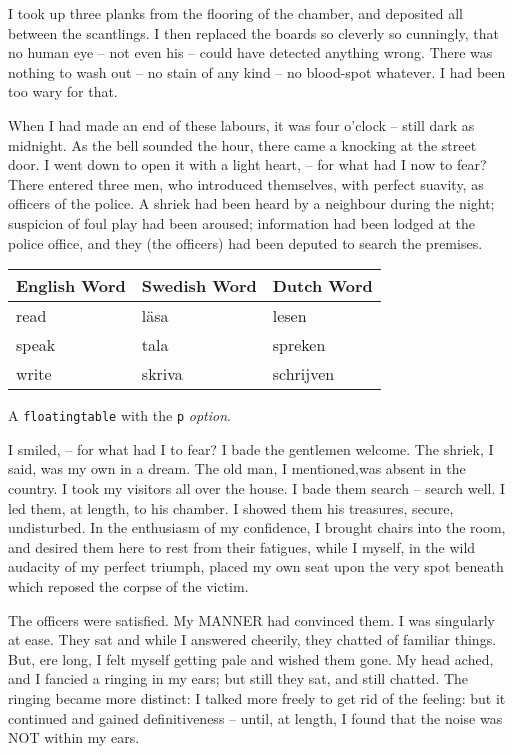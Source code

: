 \documentclass[11pt]{article}
\begin{document}
I took up three planks from the flooring of the
chamber, and deposited all between the scantlings.
I then replaced the boards so cleverly so cunningly,
that no human eye -- not even his -- could have
detected anything wrong. There was nothing to wash
out -- no stain of any kind -- no blood-spot whatever.
I had been too wary for that.

When I had made an end of these labours, it was
four o'clock -- still dark as midnight. As the bell
sounded the hour, there came a knocking at the
street door. I went down to open it with a light
heart, -- for what had I now to fear? There entered
three men, who introduced themselves, with perfect
suavity, as officers of the police. A shriek had been
heard by a neighbour during the night; suspicion
of foul play had been aroused; information had been
lodged at the police office, and they (the officers)
had been deputed to search the premises.

\begin{floatingtable}[p]{
\begin{tabular}{|l|l|l|} \hline
English Word & Swedish Word & Dutch Word \\ \hline
read & l\"asa & lesen \\
speak & tala & spreken\\
write & skriva & schrijven \\ \hline
\end{tabular}}
\caption{A \texttt{floatingtable}  with the \texttt{p}
\textit{option}.}
\end{floatingtable}
I smiled, -- for what had I to fear? I bade the
gentlemen welcome. The shriek, I said, was my
own in a dream. The old man, I mentioned,\linebreak was
absent in the country. I took my visitors all over
the house. I bade them search -- search well. I led
them, at length, to his chamber. I showed them his
treasures, secure, undisturbed. In the enthusiasm
of my confidence, I brought chairs into the room,
and desired them here to rest from their fatigues,
while I myself, in the wild audacity of my perfect
triumph, placed my own seat upon the very spot
beneath which reposed the corpse of the victim.

The officers were satisfied. My MANNER had
convinced them. I was singularly at ease. They sat
and while I answered cheerily, they chatted of
familiar things. But, ere long, I felt myself getting
pale and wished them gone. My head ached, and
I fancied a ringing in my ears; but still they sat,
and still chatted. The ringing became more distinct:
I talked more freely to get rid of the feeling:
but it continued and gained definitiveness -- until,
at length, I found that the noise was NOT within my
ears.
\end{document}

